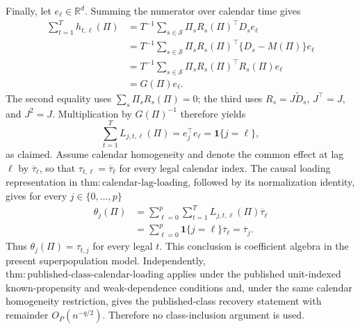Finally, let \(e_{\ell}\in\mathbb R^d\).  Summing the numerator over calendar time gives
\[
\begin{aligned}
 \sum_{t=1}^{T}h_{t,\ell}(\Pi)
 &=T^{-1}\sum_{s\in\mathcal S}\Pi_sR_s(\Pi)^{\top}D_se_{\ell}\\
 &=T^{-1}\sum_{s\in\mathcal S}\Pi_sR_s(\Pi)^{\top}
   \{D_s-M(\Pi)\}e_{\ell}\\
 &=T^{-1}\sum_{s\in\mathcal S}\Pi_sR_s(\Pi)^{\top}R_s(\Pi)e_{\ell}\\
 &=G(\Pi)e_{\ell}.
\end{aligned}
\]
The second equality uses \(\sum_s\Pi_sR_s(\Pi)=0\); the third uses \(R_s=J\widetilde D_s\), \(J^{\top}=J\), and \(J^2=J\).  Multiplication by \(G(\Pi)^{-1}\) therefore yields
\[
 \sum_{t=1}^{T}L_{j,t,\ell}(\Pi)
 =e_j^{\top}e_{\ell}=\mathbf 1\{j=\ell\},
\]
as claimed.
Assume calendar homogeneity and denote the common effect at lag \(\ell\) by \(\overline\tau_{\ell}\), so that \(\tau_{t,\ell}=\overline\tau_{\ell}\) for every legal calendar index.  The causal loading representation in \(\mathrm{thm{:}calendar\text{-}lag\text{-}loading}\), followed by its normalization identity, gives for every \(j\in\{0,\ldots,p\}\)
\[
\begin{aligned}
 \theta_j(\Pi)
 &=\sum_{\ell=0}^{p}\sum_{t=1}^{T}
   L_{j,t,\ell}(\Pi)\overline\tau_{\ell}\\
 &=\sum_{\ell=0}^{p}\mathbf 1\{j=\ell\}\overline\tau_{\ell}
 =\overline\tau_j.
\end{aligned}
\]
Thus \(\theta_j(\Pi)=\tau_{t,j}\) for every legal \(t\).  This conclusion is coefficient algebra in the present superpopulation model.  Independently, \(\mathrm{thm{:}published\text{-}class\text{-}calendar\text{-}loading}\) applies under the published unit-indexed known-propensity and weak-dependence conditions and, under the same calendar homogeneity restriction, gives the published-class recovery statement with remainder \(O_P(n^{-q/2})\).  Therefore no class-inclusion argument is used.

